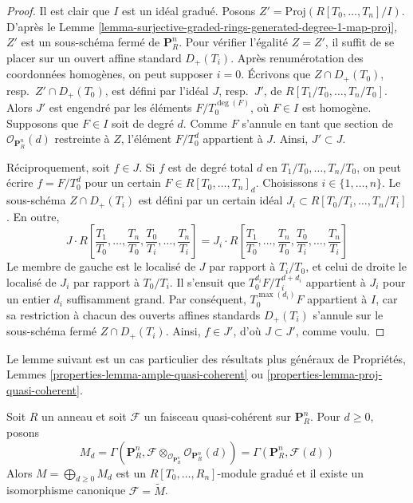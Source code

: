 \begin{proof}
Il est clair que $I$ est un idéal gradué. Posons
$Z' = \text{Proj}(R[T_0, \ldots, T_n]/I)$. D'après le
Lemme \ref{lemma-surjective-graded-rings-generated-degree-1-map-proj},
$Z'$ est
un sous-schéma fermé de $\mathbf{P}^n_R$. Pour vérifier l'égalité $Z = Z'$,
il suffit de se placer sur un ouvert affine standard $D_{+}(T_i)$.
Après renumérotation des coordonnées homogènes, on peut supposer $i = 0$.
Écrivons que $Z \cap D_{+}(T_0)$, resp.\ $Z' \cap D_{+}(T_0)$,
est défini par l'idéal $J$, resp.\ $J'$, de
$R[T_1/T_0, \ldots, T_n/T_0]$. Alors $J'$ est engendré par les éléments
$F/T_0^{\deg(F)}$, où $F \in I$ est homogène.
Supposons que $F \in I$ soit de degré $d$. Comme $F$ s'annule en tant que
section de $\mathcal{O}_{\mathbf{P}^n_R}(d)$ restreinte à $Z$, l'élément
$F/T_0^d$ appartient à $J$. Ainsi, $J' \subset J$.

\medskip\noindent
Réciproquement, soit $f \in J$. Si $f$ est de degré total $d$ en
$T_1/T_0, \ldots, T_n/T_0$, on peut écrire
$f = F/T_0^d$ pour un certain $F \in R[T_0, \ldots, T_n]_d$.
Choisissons $i \in \{1, \ldots, n\}$. Le sous-schéma
$Z \cap D_{+}(T_i)$ est défini par un certain idéal
$J_i \subset R[T_0/T_i, \ldots, T_n/T_i]$. En outre,
$$
J \cdot
R\left[
\frac{T_1}{T_0}, \ldots, \frac{T_n}{T_0},
\frac{T_0}{T_i}, \ldots, \frac{T_n}{T_i}
\right]
=
J_i \cdot
R\left[
\frac{T_1}{T_0}, \ldots, \frac{T_n}{T_0},
\frac{T_0}{T_i}, \ldots, \frac{T_n}{T_i}
\right]
$$
Le membre de gauche est le localisé de
$J$ par rapport à $T_i/T_0$, et celui
de droite le localisé de $J_i$ par rapport à $T_0/T_i$. Il s'ensuit que
$T_0^{d_i}F/T_i^{d + d_i}$ appartient à $J_i$ pour un entier $d_i$
suffisamment grand. Par conséquent,
$T_0^{\max(d_i)}F$ appartient à $I$,
car sa restriction à chacun des ouverts affines standards $D_{+}(T_i)$
s'annule sur le sous-schéma fermé $Z \cap D_{+}(T_i)$.
Ainsi, $f \in J'$, d'où $J \subset J'$, comme voulu.
\end{proof}

\noindent
Le lemme suivant est un cas particulier des résultats plus généraux de
Propriétés, Lemmes \ref{properties-lemma-ample-quasi-coherent} ou
\ref{properties-lemma-proj-quasi-coherent}.

\begin{lemma}
\label{lemma-quasi-coherent-projective-space}
Soit $R$ un anneau et soit $\mathcal{F}$ un faisceau quasi-cohérent sur
$\mathbf{P}^n_R$. Pour $d \geq 0$, posons
$$
M_d
=
\Gamma(\mathbf{P}^n_R,
\mathcal{F} \otimes_{\mathcal{O}_{\mathbf{P}^n_R}}
\mathcal{O}_{\mathbf{P}^n_R}(d))
=
\Gamma(\mathbf{P}^n_R, \mathcal{F}(d))
$$
Alors $M = \bigoplus_{d \geq 0} M_d$ est un
$R[T_0, \ldots, R_n]$-module gradué et il existe un isomorphisme canonique
$\mathcal{F} = \widetilde{M}$.
\end{lemma}

